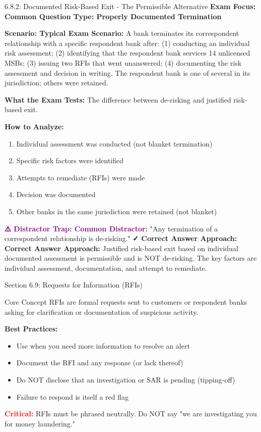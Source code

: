 \documentclass[11pt,a4paper]{beamer}
\newcommand{\redflag}[1]{\textcolor{red}{\textbf{#1}}}
\newcommand{\examfocus}[1]{\textcolor{orange!80!black}{\textbf{Exam Focus: #1}}}
\newcommand{\trap}[1]{\textcolor{purple}{\textbf{⚠️ Distractor Trap: #1}}}
\newcommand{\correct}[1]{\textcolor{green!50!black}{\textbf{✓ Correct Answer Approach: #1}}}
\newcommand{\scenario}[1]{\textcolor{blue!70!black}{\textbf{Scenario: #1}}}
\begin{document}
	\begin{frame}{6.8.2: Documented Risk-Based Exit - The Permissible Alternative}
		\examfocus{Common Question Type: Properly Documented Termination}
		
		\scenario{Typical Exam Scenario:}
		A bank terminates its correspondent relationship with a specific respondent bank after: (1) conducting an individual risk assessment; (2) identifying that the respondent bank services 14 unlicensed MSBs; (3) issuing two RFIs that went unanswered; (4) documenting the risk assessment and decision in writing. The respondent bank is one of several in its jurisdiction; others were retained.
		
		\textbf{What the Exam Tests:} The difference between de-risking and justified risk-based exit.
		
		\textbf{How to Analyze:}
		\begin{enumerate}
			\item Individual assessment was conducted (not blanket termination)
			\item Specific risk factors were identified
			\item Attempts to remediate (RFIs) were made
			\item Decision was documented
			\item Other banks in the same jurisdiction were retained (not blanket)
		\end{enumerate}
		
		\trap{Common Distractor:} "Any termination of a correspondent relationship is de-risking."
		\correct{Correct Answer Approach:} Justified risk-based exit based on individual documented assessment is permissible and is NOT de-risking. The key factors are individual assessment, documentation, and attempt to remediate.
	\end{frame}
	
	
	\begin{frame}{Section 6.9: Requests for Information (RFIs)}
		\begin{block}{Core Concept}
			RFIs are formal requests sent to customers or respondent banks asking for clarification or documentation of suspicious activity.
		\end{block}
		\textbf{Best Practices:}
		\begin{itemize}
			\item Use when you need more information to resolve an alert
			\item Document the RFI and any response (or lack thereof)
			\item Do NOT disclose that an investigation or SAR is pending (tipping-off)
			\item Failure to respond is itself a red flag
		\end{itemize}
		\redflag{Critical:} RFIs must be phrased neutrally. Do NOT say "we are investigating you for money laundering."
	\end{frame}
	
\end{document}
